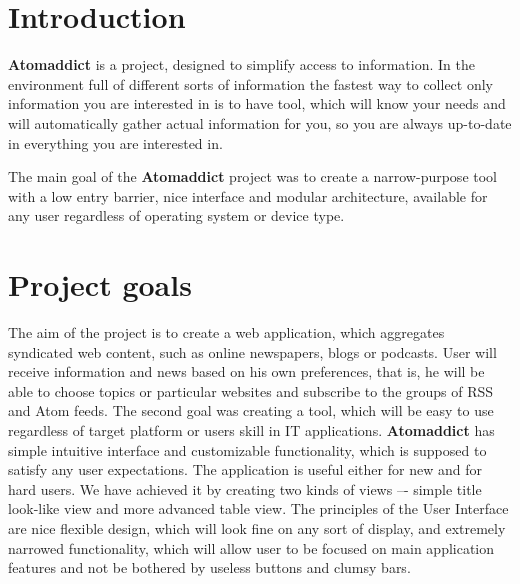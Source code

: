 \documentclass[12pt]{article}
\begin{document}
\maketitle


\section{Introduction}
\textbf{Atomaddict} is a project, designed to simplify access to information. In the environment full of different sorts of information the fastest way to collect only information you are interested in is to have tool, which will know your needs and will automatically gather actual information for you, so you are always up-to-date in everything you are interested in.

The main goal of the \textbf{Atomaddict} project was to create a narrow-purpose tool with a low entry barrier, nice interface and modular architecture, available for any user regardless of operating system or device type. 


\section{Project goals}\label{project goals}
The aim of the project is to create a web application, which aggregates syndicated web content, such as online newspapers, blogs or podcasts. User will receive information and news based on his own preferences, that is, he will be able to choose topics or particular websites and subscribe to the groups of RSS and Atom feeds. 
The second goal was creating a tool, which will be easy to use regardless of target platform or users skill in IT applications. \textbf{Atomaddict} has simple intuitive interface and customizable functionality, which is supposed to satisfy any user expectations.
The application is useful either for new and for hard users. We have achieved it by creating two kinds of views –- simple title look-like view and more advanced table view. The principles of the User Interface are nice flexible design, which will look fine on any sort of display, and extremely narrowed functionality, which will allow user to be focused on main application features and not be bothered by useless buttons and clumsy bars.
\end{document}
